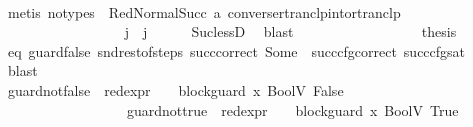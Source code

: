 \begin{isabellebody}
\ \ \ \ \ \ \ \ \ \ \ \ \ \ \ \ \ \ \isamarkupfalse%
\ {\isacharparenleft}{\kern0pt}metis\ {\isacharparenleft}{\kern0pt}no{\isacharunderscore}{\kern0pt}types{\isacharparenright}{\kern0pt}\ {\isachardoublequoteopen}{}{\isachardoublequoteclose}\ RedNormalSucc\ a{}\ converse{\isacharunderscore}{\kern0pt}rtranclp{\isacharunderscore}{\kern0pt}into{\isacharunderscore}{\kern0pt}rtranclp{\isacharparenright}{\kern0pt}\isanewline
\isanewline
\ \ \ \ \ \ \ \ \ \ \ \ \ \ \ \ \isamarkupfalse%
\ {\isachardoublequoteopen}j{\isacharprime}{\kern0pt}{\isacharprime}{\kern0pt}\ {\isacharless}{\kern0pt}\ j{\isachardoublequoteclose}\ \isamarkupfalse%
\ {}\ {}\ \isamarkupfalse%
\ Suc{\isacharunderscore}{\kern0pt}lessD\ \isamarkupfalse%
\ blast\isanewline
\isanewline
\ \ \ \ \ \ \ \ \ \ \ \ \ \ \ \ \isamarkupfalse%
\ {\isacharquery}{\kern0pt}thesis\ \isamarkupfalse%
\ eq\ guard{\isacharunderscore}{\kern0pt}false\ snd{\isacharunderscore}{\kern0pt}rest{\isacharunderscore}{\kern0pt}of{\isacharunderscore}{\kern0pt}steps\ succ{\isacharunderscore}{\kern0pt}correct\ Some\ {}\ succ{\isacharunderscore}{\kern0pt}cfg{\isacharunderscore}{\kern0pt}correct\ succ{\isacharunderscore}{\kern0pt}cfg{\isacharunderscore}{\kern0pt}sat\ \isamarkupfalse%
\ blast\isanewline
\ \ \ \ \ \ \ \ \ \ \ \ \ \ \isamarkupfalse%
\isanewline
\ \ \ \ \ \ \ \ \ \ \ \ \ \ \ \ \isamarkupfalse%
\ guard{\isacharunderscore}{\kern0pt}not{\isacharunderscore}{\kern0pt}false{}{\isacharcolon}{\kern0pt}\ {\isachardoublequoteopen}{\isacharparenleft}{\kern0pt}{\isasymnot}\ {\isacharparenleft}{\kern0pt}red{\isacharunderscore}{\kern0pt}expr\ {\isasymLambda}\ {\isasymGamma}\ {\isasymOmega}\ block{\isacharunderscore}{\kern0pt}guard\ x{}\ {\isacharparenleft}{\kern0pt}BoolV\ False{\isacharparenright}{\kern0pt}{\isacharparenright}{\kern0pt}{\isacharparenright}{\kern0pt}{\isachardoublequoteclose}\ \ \ \isanewline
\ \ \ \ \ \ \ \ \ \ \ \ \ \ \ \ \ \ guard{\isacharunderscore}{\kern0pt}not{\isacharunderscore}{\kern0pt}true{}{\isacharcolon}{\kern0pt}\ {\isachardoublequoteopen}{\isacharparenleft}{\kern0pt}{\isasymnot}\ {\isacharparenleft}{\kern0pt}red{\isacharunderscore}{\kern0pt}expr\ {\isasymLambda}\ {\isasymGamma}\ {\isasymOmega}\ block{\isacharunderscore}{\kern0pt}guard\ x{}\ {\isacharparenleft}{\kern0pt}BoolV\ True{\isacharparenright}{\kern0pt}{\isacharparenright}{\kern0pt}{\isacharparenright}{\kern0pt}{\isachardoublequoteclose}\isanewline

\end{isabellebody}
